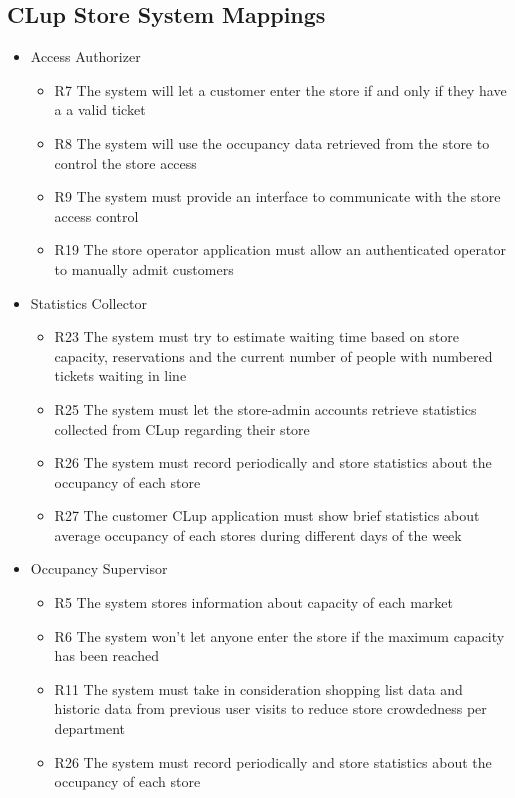 \subsection{CLup Store System Mappings}
\begin{itemize}
    \item Access Authorizer
    \begin{itemize}
        \item R7 The system will let a customer enter the store if and only if they have a a valid ticket
        \item R8 The system will use the occupancy data retrieved from the store to control the store access
        \item R9 The system must provide an interface to communicate with the store access control
        \item R19 The store operator application must allow an authenticated operator to manually admit customers
    \end{itemize}
    \item Statistics Collector
    \begin{itemize}
        \item R23 The system must try to estimate waiting time based on store capacity, reservations and the current number of people with numbered tickets waiting in line
        \item R25 The system must let the store-admin accounts retrieve statistics collected from CLup regarding their store
        \item R26 The system must record periodically and store statistics about the occupancy of each store
        \item R27 The customer CLup application must show brief statistics about average occupancy of each stores during different days of the week
    \end{itemize}
    \item Occupancy Supervisor
    \begin{itemize}
        \item R5 The system stores information about capacity of each market
        \item R6 The system won’t let anyone enter the store if the maximum capacity has been reached
        \item R11 The system must take in consideration shopping list data and historic data from previous user visits to reduce store crowdedness per department
        \item R26 The system must record periodically and store statistics about the occupancy of each store

\end{itemize}
\end{itemize}
